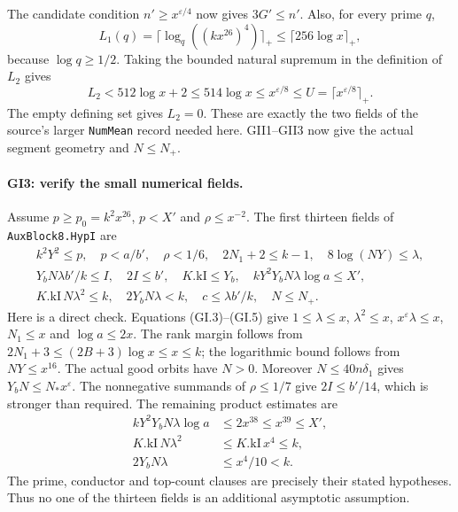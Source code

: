\documentclass[11pt,a4paper]{article}
\numberwithin{equation}{section}
\theoremstyle{remark}\newtheorem{remark}[theorem]{Remark}
\begin{document}
The candidate condition $n'\ge x^{\varepsilon/4}$ now gives
$3G'\le n'$. Also, for every prime $q$,
\[
 L_1(q)=\lceil\log_q((kx^{26})^4)\rceil_+
       \le\lceil256\log x\rceil_+,
\]
because $\log q\ge1/2$. Taking the bounded natural supremum
in the definition of $L_2$ gives
\[
 L_2<512\log x+2\le514\log x
       \le x^{\varepsilon/8}\le U=\lceil x^{\varepsilon/8}\rceil_+.
                                                               \tag{GI.6}
\]
The empty defining set gives $L_2=0$. These are exactly the two
fields of the source's larger \texttt{NumMean} record needed
here. GII1--GII3 now give the actual segment geometry and
$N\le N_+$.

\paragraph{GI3: verify the small numerical fields.}
Assume $p\ge p_0=k^2x^{26}$, $p<X'$ and $\rho\le x^{-2}$.
The first thirteen fields of \texttt{AuxBlock8.HypI} are
\[
\begin{gathered}
 k^2Y^2\le p,\quad p<a/b',\quad \rho<1/6,
 \quad 2N_1+2\le k-1,\quad 8\log(NY)\le\lambda,\\
 Y_bN\lambda b'/k\le I,\quad 2I\le b',\quad
 K.\mathrm{kI}\le Y_b,\quad
 kY^2Y_bN\lambda\log a\le X',\\
 K.\mathrm{kI}\,N\lambda^2\le k,\quad
 2Y_bN\lambda<k,\quad c\le\lambda b'/k,\quad N\le N_+.
\end{gathered}                                                    \tag{GI.7}
\]
Here is a direct check. Equations (GI.3)--(GI.5) give
$1\le\lambda\le x$, $\lambda^2\le x$,
$x^\varepsilon\lambda\le x$, $N_1\le x$ and
$\log a\le2x$. The rank margin follows from
$2N_1+3\le(2B+3)\log x\le x\le k$; the logarithmic bound
follows from $NY\le x^{16}$. The actual good orbits have $N>0$.
Moreover $N\le40n\delta_1$ gives $Y_bN\le N_*x^\varepsilon$.
The nonnegative summands of $\rho\le1/7$ give
$2I\le b'/14$, which is stronger than required.
The remaining product estimates are
\[
\begin{aligned}
 kY^2Y_bN\lambda\log a&\le2x^{38}\le x^{39}\le X',\\
 K.\mathrm{kI}\,N\lambda^2&\le K.\mathrm{kI}\,x^4\le k,\\
 2Y_bN\lambda&\le x^4/10<k.
\end{aligned}                                                    \tag{GI.8}
\]
The prime, conductor and top-count clauses are precisely their
stated hypotheses. Thus no one of the thirteen fields is an
additional asymptotic assumption.
\end{document}
